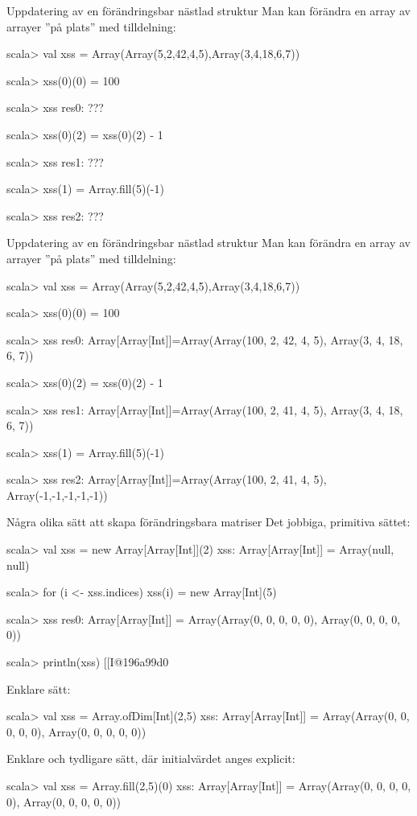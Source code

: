 \begin{Slide}{Uppdatering av en förändringsbar nästlad struktur}
Man kan förändra en array av arrayer ''på plats'' med tilldelning:
\begin{REPL}
scala> val xss = Array(Array(5,2,42,4,5),Array(3,4,18,6,7))

scala> xss(0)(0) = 100

scala> xss
res0: ???

scala> xss(0)(2) = xss(0)(2) - 1

scala> xss
res1: ???

scala> xss(1) = Array.fill(5)(-1)

scala> xss
res2: ???
\end{REPL}
\end{Slide}

\begin{Slide}{Uppdatering av en förändringsbar nästlad struktur}
Man kan förändra en array av arrayer ''på plats'' med tilldelning:
\begin{REPL}
scala> val xss = Array(Array(5,2,42,4,5),Array(3,4,18,6,7))

scala> xss(0)(0) = 100

scala> xss
res0: Array[Array[Int]]=Array(Array(100, 2, 42, 4, 5), Array(3, 4, 18, 6, 7))

scala> xss(0)(2) = xss(0)(2) - 1

scala> xss
res1: Array[Array[Int]]=Array(Array(100, 2, 41, 4, 5), Array(3, 4, 18, 6, 7))

scala> xss(1) = Array.fill(5)(-1)

scala> xss
res2: Array[Array[Int]]=Array(Array(100, 2, 41, 4, 5), Array(-1,-1,-1,-1,-1))
\end{REPL}
\end{Slide}

\begin{Slide}{Några olika sätt att skapa förändringsbara matriser}\SlideFontSmall
Det jobbiga, primitiva sättet:
\begin{REPL}
scala> val xss = new Array[Array[Int]](2)
xss: Array[Array[Int]] = Array(null, null)

scala> for (i <- xss.indices) {xss(i) = new Array[Int](5)}

scala> xss
res0: Array[Array[Int]] = Array(Array(0, 0, 0, 0, 0), Array(0, 0, 0, 0, 0))

scala> println(xss)
[[I@196a99d0
\end{REPL}
Enklare sätt:
\begin{REPL}
scala> val xss = Array.ofDim[Int](2,5)
xss: Array[Array[Int]] = Array(Array(0, 0, 0, 0, 0), Array(0, 0, 0, 0, 0))
\end{REPL}
Enklare och tydligare sätt, där initialvärdet anges explicit:
\begin{REPL}
scala> val xss = Array.fill(2,5)(0)
xss: Array[Array[Int]] = Array(Array(0, 0, 0, 0, 0), Array(0, 0, 0, 0, 0))
\end{REPL}

\end{Slide}

